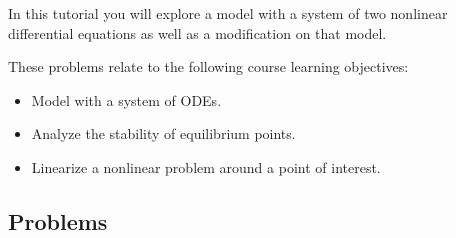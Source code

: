 		\begin{objectives}
			In this tutorial you will explore a model with a system of two nonlinear differential equations as well as a modification on that model.
			
				These problems relate to the following course learning objectives:
				\begin{itemize}\it 
					\item Model with a system of ODEs. \\[-20pt]
					\item Analyze the stability of equilibrium points. \\[-20pt]
					\item Linearize a nonlinear problem around a point of interest.
				\end{itemize}
		\end{objectives}



\vspace{-.5em}
\subsection*{Problems}
\vspace{-.5em}


